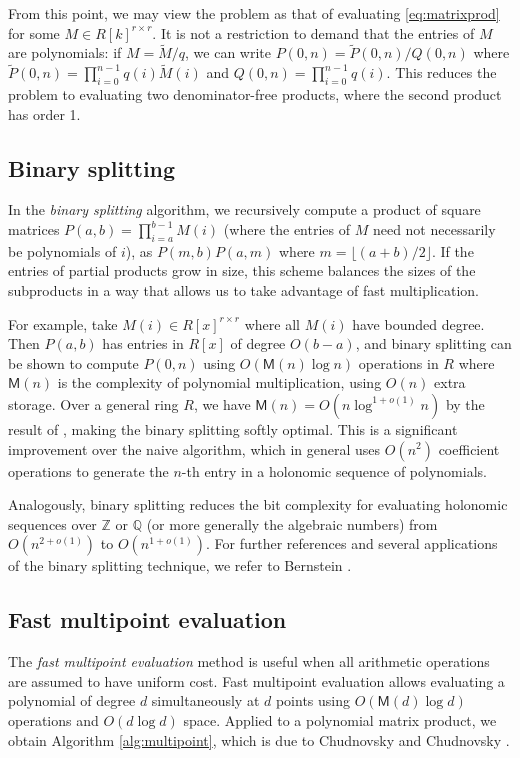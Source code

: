 \documentclass{sig-alternate}
\newcommand   \M      {\mathsf{M}}
\begin{document}
From this point, we may view the problem
as that of evaluating
\eqref{eq:matrixprod} for some $M \in R[k]^{r\times r}$.
It is not a restriction to demand
that the entries of $M$ are polynomials: if $M = \tilde M / q$,
we can write $P(0,n) = \tilde P(0,n) / Q(0,n)$ where
$\tilde P(0,n) = \prod_{i=0}^{n-1} q(i) \tilde M(i)$ and
$Q(0,n) = \prod_{i=0}^{n-1} q(i)$. This reduces the
problem to evaluating two denominator-free products,
where the second product has order 1.

\subsection{Binary splitting}

In the \emph{binary splitting} algorithm, we recursively compute a
product of square matrices
$P(a,b) = \prod_{i=a}^{b-1} M(i)$ (where the
entries of $M$ need not necessarily be polynomials of $i$), 
as
$P(m,b) P(a,m)$ where ${m = \lfloor (a+b) / 2 \rfloor}$.
If the entries of partial products grow in size,
this scheme balances the sizes of the subproducts in a way
that allows us to take advantage of fast multiplication.

For example, take $M(i) \in R[x]^{r\times r}$ where all $M(i)$
have bounded degree.
Then $P(a,b)$ has entries in $R[x]$ of
degree $O(b-a)$, and binary splitting can be shown to compute
$P(0,n)$ using $O(\M(n) \log n)$ operations in $R$ where
$\M(n)$ is the complexity of polynomial multiplication,
using $O(n)$ extra storage.
Over a general ring $R$, we have
$\M(n) = O(n \log^{1+o(1)} n)$ by the result of \cite{CantorKaltofen1991},
making the binary splitting softly optimal.
This is a significant improvement over the naive algorithm, which in general
uses $O(n^2)$ coefficient operations to generate the $n$-th entry in a
holonomic sequence of polynomials.

Analogously, binary splitting reduces
the bit complexity for evaluating holonomic sequences over $\mathbb{Z}$ or
$\mathbb{Q}$ (or more generally the algebraic numbers) from
$O(n^{2+o(1)})$ to $O(n^{1+o(1)})$. For further references and
several applications of the binary splitting technique,
we refer to Bernstein \cite{Bernstein2008}.

\subsection{Fast multipoint evaluation}

The \emph{fast multipoint evaluation} method is useful when all
arithmetic operations are assumed to have uniform cost. Fast
multipoint evaluation allows evaluating a polynomial of
degree $d$ simultaneously at $d$ points using $O(\textsf{M}(d) \log d)$
operations and $O(d \log d)$ space.
Applied to a polynomial matrix product, we obtain
Algorithm \ref{alg:multipoint}, which is due to
Chudnovsky and Chudnovsky \cite{ChudnovskyChudnovsky1988}.
\end{document}

